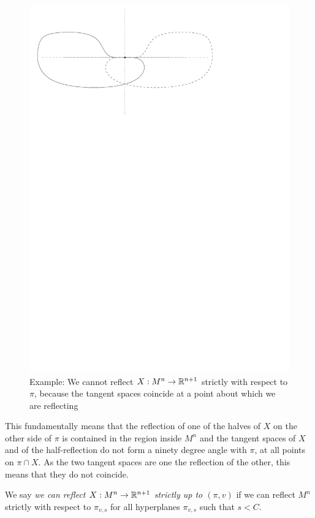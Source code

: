 \begin{figure}
\centering
\includegraphics[width=\textwidth]{"figures/9_boundary_contact"}
\caption{Example: We cannot reflect $X: M^n\rightarrow \mathbb{R}^{n+1}$ strictly with respect to $\pi$, because the tangent spaces coincide at a point about which we are reflecting}
\end{figure}

This fundamentally means that the reflection of one of the halves of $X$ on the other side of $\pi$ is contained in the region inside $M^n$ and the tangent spaces of $X$ and of the half-reflection do not form a ninety degree angle with $\pi$, at all points on $\pi\cap X$. As the two tangent spaces are one the reflection of the other, this means that they do not coincide.   
\begin{defin}
	We say {\em we can reflect $X: M^n\rightarrow \mathbb{R}^{n+1}$ strictly up to $(\pi,v)$} if we can reflect $M^n$ strictly with respect to $\pi_{v, s}$ for all hyperplanes $\pi_{v, s}$ such that $s<C$.  
\end{defin}

